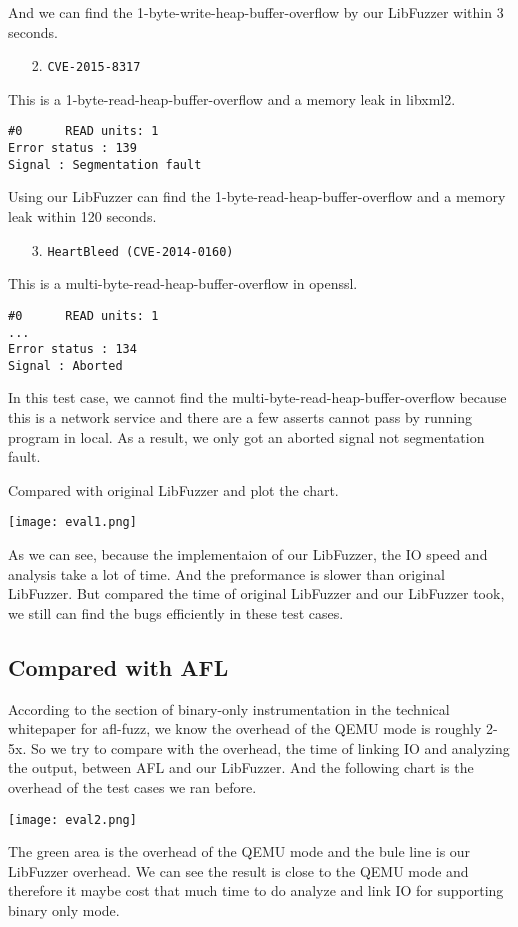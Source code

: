 And we can find the 1-byte-write-heap-buffer-overflow by our LibFuzzer within 3 seconds.

\begin{enumerate}
    \item [2.] \texttt{CVE-2015-8317}
\end{enumerate}

This is a 1-byte-read-heap-buffer-overflow and a memory leak in libxml2.

\begin{lstlisting}
#0      READ units: 1
Error status : 139
Signal : Segmentation fault
\end{lstlisting}

Using our LibFuzzer can find the 1-byte-read-heap-buffer-overflow and a memory leak within 120 seconds.

\begin{enumerate}
    \item [3.] \texttt{HeartBleed (CVE-2014-0160)}
\end{enumerate}

This is a multi-byte-read-heap-buffer-overflow in openssl.

\begin{lstlisting}
#0      READ units: 1
...
Error status : 134
Signal : Aborted
\end{lstlisting}

In this test case, we cannot find the multi-byte-read-heap-buffer-overflow because this is a network service and there are a few asserts cannot pass by running program in local. As a result, we only got an aborted signal not segmentation fault.

Compared with original LibFuzzer and plot the chart.

\texttt{[image: eval1.png]}

As we can see, because the implementaion of our LibFuzzer, the IO speed and analysis take a lot of time. And the preformance is slower than original LibFuzzer. But compared the time of original LibFuzzer and our LibFuzzer took, we still can find the bugs efficiently in these test cases.

\subsection{Compared with AFL}

According to the section of binary-only instrumentation in the technical whitepaper for afl-fuzz, we know the overhead of the QEMU mode is roughly 2-5x. So we try to compare with the overhead, the time of linking IO and analyzing the output, between AFL and our LibFuzzer. And the following chart is the overhead of the test cases we ran before.

\texttt{[image: eval2.png]}

The green area is the overhead of the QEMU mode and the bule line is our LibFuzzer overhead. We can see the result is close to the QEMU mode and therefore it maybe cost that much time to do analyze and link IO for supporting binary only mode.

